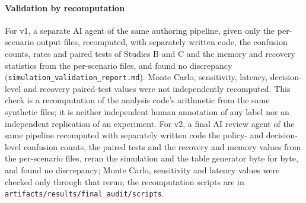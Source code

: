 \paragraph{Validation by recomputation} For v1, a separate AI agent of the same authoring pipeline, given only the per-scenario output files, recomputed, with separately written code, the confusion counts, rates and paired tests of Studies B and C and the memory and recovery statistics from the per-scenario files, and found no discrepancy (\texttt{simulation\_validation\_report.md}). Monte Carlo, sensitivity, latency, decision-level and recovery paired-test values were not independently recomputed. This check is a recomputation of the analysis code's arithmetic from the same synthetic files; it is neither independent human annotation of any label nor an independent replication of an experiment. For v2, a final AI review agent of the same pipeline recomputed with separately written code the policy- and decision-level confusion counts, the paired tests and the recovery and memory values from the per-scenario files, reran the simulation and the table generator byte for byte, and found no discrepancy; Monte Carlo, sensitivity and latency values were checked only through that rerun; the recomputation scripts are in \texttt{artifacts/results/final\_audit/scripts}.

